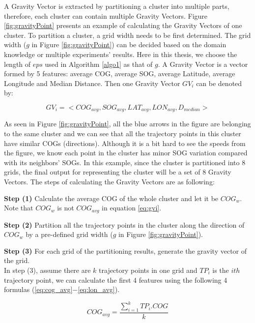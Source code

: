 \documentclass[12pt,glossary]{dalcsthesis}
\begin{document}
A Gravity Vector is extracted by partitioning a cluster into multiple parts, therefore, each cluster can contain multiple Gravity Vectors. Figure \ref{fig:gravityPoint} presents an example of calculating the Gravity Vectors of one cluster. To partition a cluster, a grid width needs to be first determined. The grid width ($g$ in Figure \ref{fig:gravityPoint}) can be decided based on the domain knowledge or multiple experiments' results. Here in this thesis, we choose the length of $eps$ used in Algorithm \ref{algo1} as that of $g$. A Gravity Vector is a vector formed by 5 features: average COG, average SOG, average Latitude, average Longitude and Median Distance. Then one Gravity Vector $GV_i$ can be denoted by:

\begin{equation} 
\label{eq:gvi}
GV_i = <COG_{avg},SOG_{avg},LAT_{avg},LON_{avg},D_{median}>
\end{equation}

As seen in Figure \ref{fig:gravityPoint}, all the blue arrows in the figure are belonging to the same cluster and we can see that all the trajectory points in this cluster have similar COGs (directions). Although it is a bit hard to see the speeds from the figure, we know each point in the cluster has minor SOG variation compared with its neighbors' SOGs. In this example, since the cluster is partitioned into 8 grids, the final output for representing the cluster will be a set of 8 Gravity Vectors. The steps of calculating the Gravity Vectors are as following:

\textbf{Step (1)} Calculate the average COG of the whole cluster and let it be $COG_w$. Note that $COG_w$ is not $COG_{avg}$ in equation \ref{eq:gvi}.

\textbf{Step (2)} Partition all the trajectory points in the cluster along the direction of $COG_w$ by a pre-defined grid width ($g$ in Figure \ref{fig:gravityPoint}). 

\textbf{Step (3)} For each grid of the partitioning results, generate the gravity vector of the grid. \\

In step (3), assume there are $k$ trajectory points in one grid and $TP_i$ is the $ith$ trajectory point, we can calculate the first 4 features using the following 4 formulas (\ref{eq:cog_avg}$-$\ref{eq:lon_avg}). 


\begin{equation} 
\label{eq:cog_avg}
COG_{avg} = \frac{\sum_{i=1}^k TP_i.COG}{k}
\end{equation}
\end{document}
